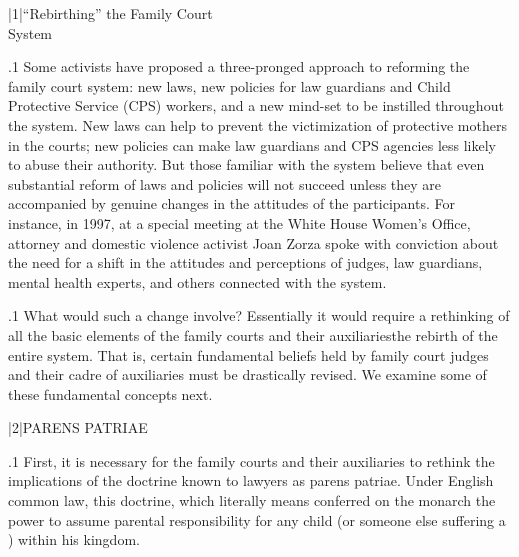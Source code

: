 \documentclass[11pt, twoside]{article}
\begin{document}
\thispagestyle{empty}

{\fontsize{13}{19}\selectfont


\hspace{-5em}\begin{minipage}{1.1\textwidth}
\begin{flushright}
{\fontsize{14}{22}\selectfont
\textbf{%
}
}
\end{flushright}
\end{minipage}


\vspace{6em}





\s|1|{``Rebirthing'' the Family Court\\\hfill{}System}

\p.1{%
\noindent{}Some activists have proposed a three-pronged approach to reforming the family court system: new laws, new policies for law guardians
and Child Protective Service (CPS) workers, and a new mind-set to be
instilled throughout the system. New laws can help to prevent the victimization of protective mothers in the courts; new policies can make
law guardians and CPS agencies less likely to abuse their authority. But
those familiar with the system believe that even substantial reform of
laws and policies will not succeed unless they are accompanied by genuine changes in the attitudes of the participants. For instance, in 1997,
at a special meeting at the White House Women’s Office, attorney and
domestic violence activist Joan Zorza spoke with conviction about the
need for a  shift in the attitudes and perceptions of judges, law
guardians, mental health experts, and others connected with the system.
}%

\p.1{%
What would such a  change involve? Essentially it would require a rethinking of all the basic elements of the family courts and their
auxiliaries\mdash{}the rebirth of the entire system. That is, certain fundamental beliefs held by family court judges and their cadre of auxiliaries must
be drastically revised. We examine some of these fundamental concepts
next.
}%


\s|2|{PARENS PATRIAE}

\p.1{%
\noindent{}First, it is necessary for the family courts and their auxiliaries to rethink
the implications of the doctrine known to lawyers as parens patriae.
Under English common law, this doctrine, which literally means  conferred on the monarch the power to assume parental responsibility for any child (or someone else suffering
a ) within his kingdom.
}%

}
\end{document}
